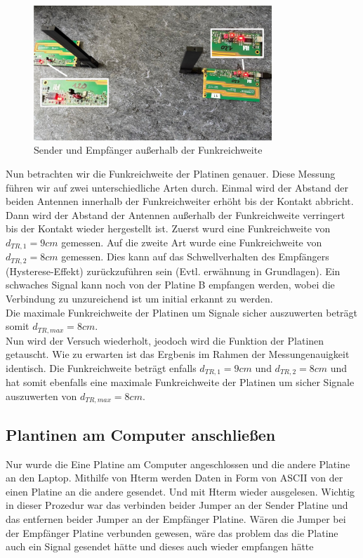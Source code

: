 \begin{figure}[H]
    \centering
    \includegraphics[width=0.8\textwidth]{Pictures/Task2a.jpg}
    \caption{Sender und Empfänger außerhalb der Funkreichweite}
    \label{fig:Task2a}
\end{figure}
Nun betrachten wir die Funkreichweite der Platinen genauer. Diese Messung führen wir auf zwei unterschiedliche
Arten durch. Einmal wird der Abstand der beiden Antennen innerhalb der Funkreichweiter erhöht bis der Kontakt
abbricht. Dann wird der Abstand der Antennen außerhalb der Funkreichweite verringert bis der Kontakt wieder
hergestellt ist. Zuerst wurd eine Funkreichweite von $d_{TR,1}=9cm$ gemessen. Auf die zweite Art wurde eine
Funkreichweite von $d_{TR,2}=8cm$ gemessen. Dies kann auf das Schwellverhalten des Empfängers (Hysterese-Effekt)
zurückzuführen sein (Evtl. erwähnung in Grundlagen). 
Ein schwaches Signal kann noch von der Platine B empfangen werden, wobei die Verbindung zu unzureichend ist um 
initial erkannt zu werden.\\
Die maximale Funkreichweite der Platinen um Signale sicher auszuwerten beträgt somit $d_{TR,max}=8cm$.
\\
Nun wird der Versuch wiederholt, jeodoch wird die Funktion der Platinen getauscht. Wie zu erwarten ist das Ergbenis
im Rahmen der Messungenauigkeit identisch. Die Funkreichweite beträgt enfalls $d_{TR,1}=9cm$ und $d_{TR,2}=8cm$ und 
hat somit ebenfalls eine maximale Funkreichweite der Platinen um sicher Signale auszuwerten von $d_{TR,max}=8cm$.

\subsection{Plantinen am Computer anschließen}
Nur wurde die Eine Platine am Computer angeschlossen und die andere Platine an den Laptop.
Mithilfe von Hterm werden Daten in Form von ASCII von der einen Platine an die andere gesendet.
Und mit Hterm wieder ausgelesen.
Wichtig in dieser Prozedur war das verbinden beider Jumper an der Sender Platine und das entfernen beider
Jumper an der Empfänger Platine. 
Wären die Jumper bei der Empfänger Platine verbunden gewesen, wäre das problem das die Platine auch 
ein Signal gesendet hätte und dieses auch wieder empfangen hätte
